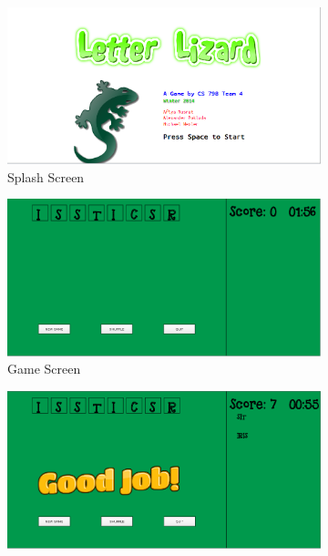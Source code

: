 \begin{figure}
    \centering
    \begin{subfigure}{0.49\textwidth}
        \includegraphics[width=\textwidth]{../screenshots/luasplash.png}
        \caption{Splash Screen}
        \label{luasplash}
    \end{subfigure}
    \begin{subfigure}{0.49\textwidth}
        \includegraphics[width=\textwidth]{../screenshots/luabegin.png}
        \caption{Game Screen}
        \label{luabegin}
    \end{subfigure}
    \begin{subfigure}{0.49\textwidth}
        \includegraphics[width=\textwidth]{../screenshots/luagameplay.png}

\end{subfigure}
\end{figure}
